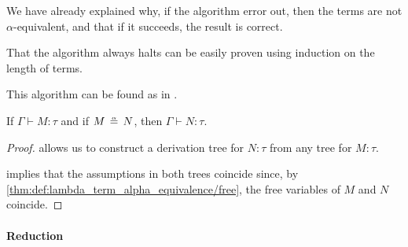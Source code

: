 \begin{defproof}
  We have already explained why, if the algorithm error out, then the terms are not \( \alpha \)-equivalent, and that if it succeeds, the result is correct.

  That the algorithm always halts can be easily proven using induction on the length of terms.
\end{defproof}
\begin{comments}
  \item This algorithm can be found as  in \cite{notebook:code}.
\end{comments}

\begin{proposition}\label{thm:alpha_equivalent_term_typing}
  If \( \Gamma \vdash M: \tau \) and if \( M \aequiv N \), then \( \Gamma \vdash N: \tau \).
\end{proposition}
\begin{proof}
   allows us to construct a derivation tree for \( N: \tau \) from any tree for \( M: \tau \).

   implies that the assumptions in both trees coincide since, by \cref{thm:def:lambda_term_alpha_equivalence/free}, the free variables of \( M \) and \( N \) coincide.
\end{proof}

\paragraph{Reduction}

